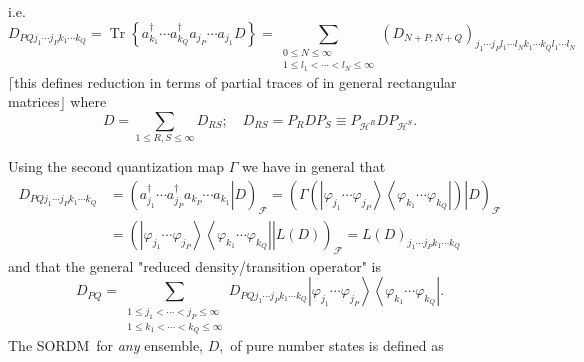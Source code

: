 \documentclass[aps,preprint]{revtex4}%
\begin{document}
i.e.
\begin{equation}
D_{PQj_{1}\cdots j_{P}k_{1}\cdots k_{Q}}=\operatorname{Tr}\left\{  a_{k_{1}%
}^{\dagger}\cdots a_{k_{Q}}^{\dagger}a_{j_{P}}\cdots a_{j_{1}}D\right\}
=\sum_{\substack{0\leq N\leq\infty\\1\leq l_{1}<\cdots<l_{N}\leq\infty
}}\left(  D_{N+P,N+Q}\right)  _{j_{1}\cdots j_{P}l_{1}\cdots l_{N}k_{1}\cdots
k_{Q}l_{1}\cdots l_{N}}%
\end{equation}
$\lceil$this defines reduction in terms of partial traces of in general
rectangular matrices$\rfloor$ where
\begin{equation}
D=\sum_{1\leq R,S\leq\infty}D_{RS};\quad D_{RS}=P_{R}DP_{S}\equiv
P_{\mathcal{H}^{R}}DP_{\mathcal{H}^{S}}.
\end{equation}


Using the second quantization map $\Gamma$ we have in general that
\begin{align}
D_{PQj_{1}\cdots j_{P}k_{1}\cdots k_{Q}} &  =\left(  \left.  a_{j_{1}%
}^{\dagger}\cdots a_{j_{P}}^{\dagger}a_{k_{P}}\cdots a_{k_{1}}\right\vert
D\right)  _{\mathcal{F}}=\left(  \left.  \Gamma\left(  \left\vert
\varphi_{j_{1}}\cdots\varphi_{j_{P}}\right\rangle \left\langle \varphi_{k_{1}%
}\cdots\varphi_{k_{Q}}\right\vert \right)  \right\vert D\right)
_{\mathcal{F}}\nonumber\\
&  =\left(  \left.  \left\vert \varphi_{j_{1}}\cdots\varphi_{j_{P}%
}\right\rangle \left\langle \varphi_{k_{1}}\cdots\varphi_{k_{Q}}\right\vert
\right\vert L\left(  D\right)  \right)  _{\mathcal{F}}=L\left(  D\right)
_{j_{1}\cdots j_{P}k_{1}\cdots k_{Q}}%
\end{align}
and that the general "reduced density/transition operator" is
\begin{equation}
D_{PQ}=\sum_{\substack{1\leq j_{1}<\cdots<j_{P}\leq\infty\\1\leq k_{1}%
<\cdots<k_{Q}\leq\infty}}D_{PQj_{1}\cdots j_{P}k_{1}\cdots k_{Q}}\left\vert
\varphi_{j_{1}}\cdots\varphi_{j_{P}}\right\rangle \left\langle \varphi_{k_{1}%
}\cdots\varphi_{k_{Q}}\right\vert .
\end{equation}
The SORDM\ for \emph{any }ensemble, $D,$ of pure number states is defined as
\end{document}
